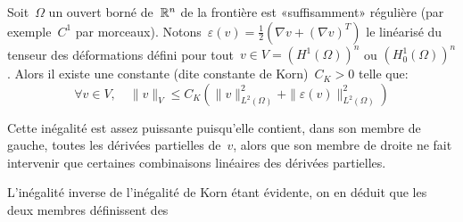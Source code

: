 \medskipvm
\begin{theoreme}
Soit~$\Omega$ un ouvert borné de~$\mathbb R^n$ de la frontière est «suffisamment» régulière (par exemple~$C^1$ par morceaux).
Notons~$\varepsilon(v)=\frac{1}{2}\left(\nabla v + (\nabla v)^T \right)$ le linéarisé du tenseur des déformations défini pour tout~$v\in V=\left(H^1(\Omega)\right)^n$ ou $\left(H^1_0(\Omega)\right)^n$.
Alors il existe une constante (dite constante de Korn)~$C_K>0$ telle que:
\begin{equation}
\forall v\in V, \quad
 \|v\|_{V} \le C_K \left( \|v\|^2_{L^2(\Omega)}+ \|\varepsilon(v)\|^2_{L^2(\Omega)}
\right)
\end{equation}
\end{theoreme}

Cette inégalité est assez puissante puisqu'elle contient, dans son membre de gauche, toutes les dérivées partielles de~$v$, alors que son membre de droite ne fait intervenir que certaines combinaisons linéaires des dérivées partielles.

L'inégalité inverse de l'inégalité de Korn étant évidente, on en déduit que les deux membres définissent des 

\medskip
{}



